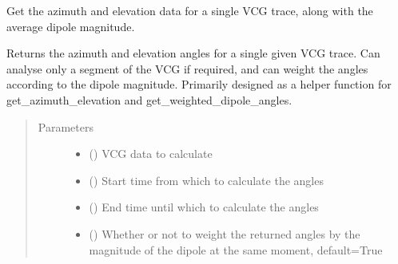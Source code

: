 \documentclass[letterpaper,10pt,english]{sphinxmanual}
\begin{document}
\begin{fulllineitems}
\label{\detokenize{_autosummary/signalanalysis.vcg.get_single_vcg_azimuth_elevation:signalanalysis.vcg.get_single_vcg_azimuth_elevation}}
\sphinxAtStartPar
Get the azimuth and elevation data for a single VCG trace, along with the average dipole magnitude.

\sphinxAtStartPar
Returns the azimuth and elevation angles for a single given VCG trace. Can analyse only a segment of the
VCG if required, and can weight the angles according to the dipole magnitude. Primarily designed as a helper
function for get\_azimuth\_elevation and get\_weighted\_dipole\_angles.
\begin{quote}\begin{description}
\item[{Parameters}] \leavevmode\begin{itemize}
\item {} 
\sphinxAtStartPar
{} () \textendash{} VCG data to calculate

\item {} 
\sphinxAtStartPar
{} () \textendash{} Start time from which to calculate the angles

\item {} 
\sphinxAtStartPar
{} () \textendash{} End time until which to calculate the angles

\item {} 
\sphinxAtStartPar
{} (\sphinxstyleliteralemphasis{\sphinxupquote{, }}) \textendash{} Whether or not to weight the returned angles by the magnitude of the dipole at the same moment, default=True


\end{itemize}
\end{description}
\end{quote}
\end{fulllineitems}
\end{document}
